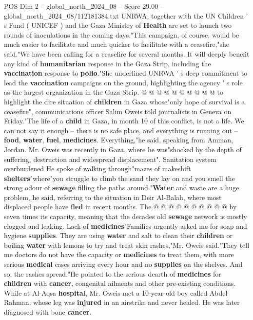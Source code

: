 \begin{textsample}{POS Dim 2 – global\_north\_2024\_08 – Score 29.00 – global\_north\_2024\_08/112181384.txt}
UNRWA, together with the UN Children ' s Fund ( UNICEF ) and the Gaza Ministry of \textbf{Health} are set to launch two rounds of inoculations in the coming days."This campaign, of course, would be much easier to facilitate and much quicker to facilitate with a ceasefire,"she said."We have been calling for a ceasefire for several months.
It will deeply benefit any kind of \textbf{humanitarian} response in the Gaza Strip, including the \textbf{vaccination} response to \textbf{polio}."She underlined UNRWA ' s deep commitment to lead the \textbf{vaccination} campaigns on the ground, highlighting the agency ' s role as the largest organization in the Gaza Strip. @ @ @ @ @ @ @ @ @ @ to highlight the dire situation of \textbf{children} in Gaza whose"only hope of survival is a ceasefire", communications officer Salim Oweis told journalists in Geneva on Friday."The life of a \textbf{child} in Gaza, in month 10 of this conflict, is not a life.
We can not say it enough -- there is no safe place, and everything is running out -- \textbf{food}, \textbf{water}, \textbf{fuel}, \textbf{medicines}.
Everything,"he said, speaking from Amman, Jordan.
Mr.
Oweis was recently in Gaza, where he was"shocked by the depth of suffering, destruction and widespread displacement".
Sanitation system overburdened He spoke of walking through"mazes of makeshift \textbf{shelters}"where"you struggle to climb the sand they lay on and you smell the strong odour of \textbf{sewage} filling the paths around."\textbf{Water} and waste are a huge problem, he said, referring to the situation in Deir Al-Balah, where most displaced people have \textbf{fled} in recent months.
The @ @ @ @ @ @ @ @ @ @ by seven times its capacity, meaning that the decades old \textbf{sewage} network is mostly clogged and leaking.
Lack of \textbf{medicines}"Families urgently asked me for soap and hygiene \textbf{supplies}.
They are using \textbf{water} and salt to clean their \textbf{children} or boiling \textbf{water} with lemons to try and treat skin rashes,"Mr.
Oweis said."They tell me doctors do not have the capacity or \textbf{medicines} to treat them, with more serious \textbf{medical} cases arriving every hour and no \textbf{supplies} on the shelves.
And so, the rashes spread."He pointed to the serious dearth of \textbf{medicines} for \textbf{children} with \textbf{cancer}, congenital ailments and other pre-existing conditions.
While at Al-Aqsa \textbf{hospital}, Mr.
Oweis met a 10-year-old boy called Abdel Rahman, whose leg was \textbf{injured} in an airstrike and never healed.
He was later diagnosed with bone \textbf{cancer}.

\end{textsample}
